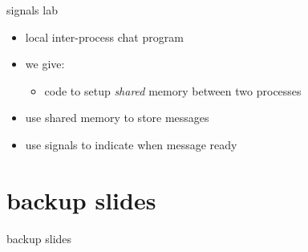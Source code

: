 \begin{frame}{signals lab}
    \begin{itemize}
    \item local inter-process chat program
    \item we give:
        \begin{itemize}
        \item code to setup \textit{shared} memory between two processes
        \end{itemize}
    \item use shared memory to store messages
    \item use signals to indicate when message ready
    \end{itemize}
\end{frame}



\section{backup slides}
\begin{frame}{backup slides}
\end{frame}






